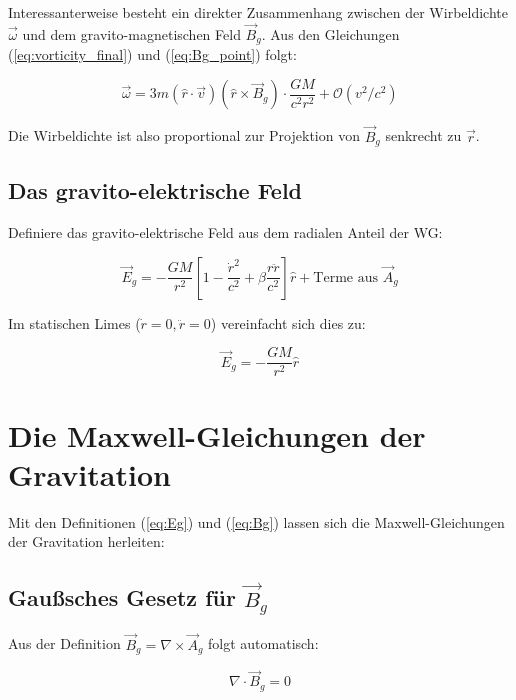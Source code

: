 \documentclass[12pt,a4paper]{article}
\begin{document}
Interessanterweise besteht ein direkter Zusammenhang zwischen der Wirbeldichte \(\vec{\omega}\) und dem gravito-magnetischen Feld \(\vec{B}_g\). Aus den Gleichungen (\ref{eq:vorticity_final}) und (\ref{eq:Bg_point}) folgt:

\begin{equation}
\vec{\omega} = 3m (\hat{r}\cdot\vec{v}) (\hat{r} \times \vec{B}_g) \cdot \frac{GM}{c^2 r^2} + \mathcal{O}(v^2/c^2)
\end{equation}

Die Wirbeldichte ist also proportional zur Projektion von \(\vec{B}_g\) senkrecht zu \(\vec{r}\).

\subsection{Das gravito-elektrische Feld}

Definiere das gravito-elektrische Feld aus dem radialen Anteil der WG:

\begin{equation}
\vec{E}_g = -\frac{GM}{r^2} \left[1 - \frac{\dot{r}^2}{c^2} + \beta\frac{r\ddot{r}}{c^2}\right] \hat{r} + \text{Terme aus } \vec{A}_g
\label{eq:Eg}
\end{equation}

Im statischen Limes (\(\dot{r} = 0, \ddot{r} = 0\)) vereinfacht sich dies zu:

\begin{equation}
\vec{E}_g = -\frac{GM}{r^2} \hat{r}
\label{eq:Eg_static}
\end{equation}

\section{Die Maxwell-Gleichungen der Gravitation}

Mit den Definitionen (\ref{eq:Eg}) und (\ref{eq:Bg}) lassen sich die Maxwell-Gleichungen der Gravitation herleiten:

\subsection{Gaußsches Gesetz für \(\vec{B}_g\)}

Aus der Definition \(\vec{B}_g = \nabla \times \vec{A}_g\) folgt automatisch:

\begin{equation}
\nabla \cdot \vec{B}_g = 0
\label{eq:divBg}
\end{equation}
\end{document}
